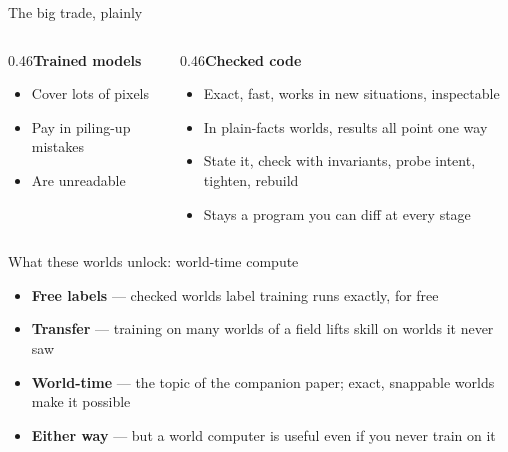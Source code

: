 \documentclass[aspectratio=169,11pt]{beamer}
\begin{document}
\begin{frame}{The big trade, plainly}\vfill
\begin{columns}[T]
\begin{column}{0.46\textwidth}{\color{owmuted}\bfseries\large Trained models}\par\medskip\begin{itemize}\small \item Cover lots of pixels
\item Pay in piling-up mistakes
\item Are unreadable\end{itemize}\end{column}
\begin{column}{0.46\textwidth}{\color{owteal}\bfseries\large Checked code}\par\medskip\begin{itemize}\small \item Exact, fast, works in new situations, inspectable
\item In plain-facts worlds, results all point one way
\item State it, check with invariants, probe intent, tighten, rebuild
\item Stays a program you can diff at every stage\end{itemize}\end{column}
\end{columns}\vfill\end{frame}
\begin{frame}{What these worlds unlock: world-time compute}\vfill\begin{itemize}\item \textbf{Free labels} --- checked worlds label training runs exactly, for free\item \textbf{Transfer} --- training on many worlds of a field lifts skill on worlds it never saw\item \textbf{World-time} --- the topic of the companion paper; exact, snappable worlds make it possible\item \textbf{Either way} --- but a world computer is useful even if you never train on it\end{itemize}\vfill\end{frame}
\end{document}
